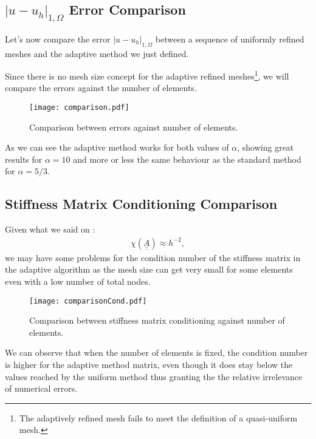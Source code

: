 \subsection[Error Comparison]{$|u - u_h|_{1, \Omega}$ Error Comparison}

Let's now compare the error $|u - u_h|_{1, \Omega}$ between a sequence of uniformly refined meshes and the adaptive method we just defined.

Since there is no mesh size concept for the adaptive refined meshes\footnote{The adaptively refined mesh fails to meet the definition of a quasi-uniform mesh.}, we will compare the errors against the number of elements.

\begin{figure}[!ht]
	\centering
	\texttt{[image: comparison.pdf]}
	\caption{Comparison between errors against number of elements.}
\end{figure}

As we can see the adaptive method works for both values of $\alpha$, showing great results for $\alpha = 10$ and more or less the same behaviour as the standard method for $\alpha = 5/3$.

\newpage
\begin{multicols}{2}
	
\end{multicols}

\newpage
\subsection{Stiffness Matrix Conditioning Comparison}

Given what we said on :
\begin{gather}
	\chi(\underline{\underline{A}}) \approx h^{-2},
\end{gather}
we may have some problems for the condition number of the stiffness matrix in the adaptive algorithm as the mesh size can get very small for some elements even with a low number of total nodes.

\begin{figure}[!ht]
	\centering
	\texttt{[image: comparisonCond.pdf]}
	\caption{Comparison between stiffness matrix conditioning against number of elements.}
\end{figure}

We can observe that when the number of elements is fixed, the condition number is higher for the adaptive method matrix, even though it does stay below the values reached by the uniform method thus granting the the relative irrelevance of numerical errors.

\newpage
\begin{multicols}{2}
	
\end{multicols}